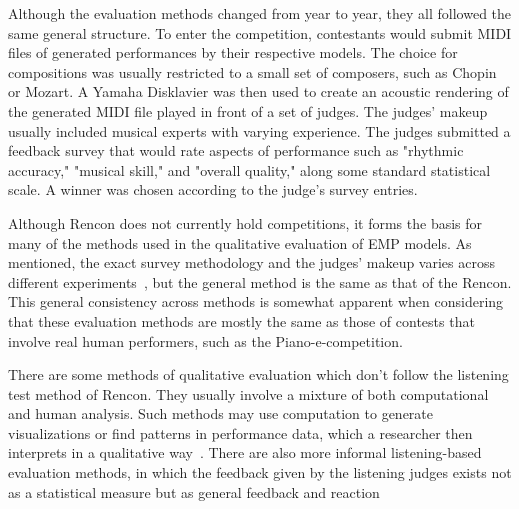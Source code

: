Although the evaluation methods changed from year to year, they all followed the same general structure. To enter the competition, contestants would submit MIDI files of generated performances by their respective models. The choice for compositions was usually restricted to a small set of composers, such as Chopin or Mozart. A Yamaha Disklavier was then used to create an acoustic rendering of the generated MIDI file played in front of a set of judges. The judges' makeup usually included musical experts with varying experience. The judges submitted a feedback survey that would rate aspects of performance such as "rhythmic accuracy," "musical skill," and "overall quality," along some standard statistical scale. A winner was chosen according to the judge's survey entries. 

Although Rencon does not currently hold competitions, it forms the basis for many of the methods used in the qualitative evaluation of EMP models. As mentioned, the exact survey methodology and the judges' makeup varies across different experiments~\cite{jeong2019virtuosonet, schubert2017algorithms}, but the general method is the same as that of the Rencon. This general consistency across methods is somewhat apparent when considering that these evaluation methods are mostly the same as those of contests that involve real human performers, such as the Piano-e-competition. 

There are some methods of qualitative evaluation which don't follow the listening test method of Rencon. They usually involve a mixture of both computational and human analysis. Such methods may use computation to generate visualizations or find patterns in performance data, which a researcher then interprets in a qualitative way~\cite{widmer2009yqx,jeong2019score, grachten2012linear}. There are also more informal listening-based evaluation methods, in which the feedback given by the listening judges exists not as a statistical measure but as general feedback and reaction~\cite{oore2020time}
